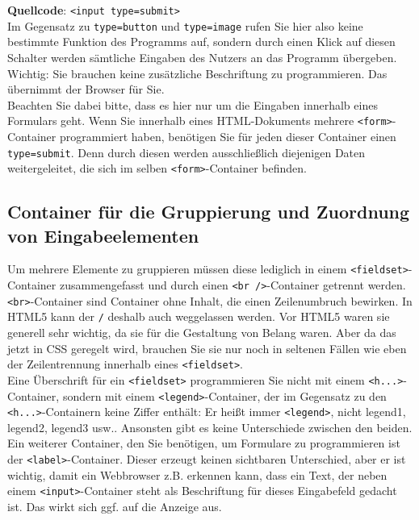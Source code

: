 \begin{itemize}
	\textbf{Quellcode}: \verb|<input type=submit>|\\
	
	Im Gegensatz zu \verb|type=button| und \verb|type=image| rufen Sie hier also keine bestimmte Funktion des Programms auf, sondern durch einen Klick auf diesen Schalter werden sämtliche Eingaben des Nutzers an das Programm übergeben.\\
	
	Wichtig: Sie brauchen keine zusätzliche Beschriftung zu programmieren. Das übernimmt der Browser für Sie.\\
	
	Beachten Sie dabei bitte, dass es hier nur um die Eingaben innerhalb eines Formulars geht. Wenn Sie innerhalb eines HTML-Dokuments mehrere \verb|<form>|-Container programmiert haben, benötigen Sie für jeden dieser Container einen \verb|type=submit|. Denn durch diesen werden ausschließlich diejenigen Daten weitergeleitet, die sich im selben \verb|<form>|-Container befinden.
\end{itemize}

\subsection{Container für die Gruppierung und Zuordnung von Eingabeelementen}

Um mehrere Elemente zu gruppieren müssen diese lediglich in einem \verb|<fieldset>|-Container zusammengefasst und durch einen \verb|<br />|-Container getrennt werden. \verb|<br>|-Container sind Container ohne Inhalt, die einen Zeilenumbruch bewirken. In HTML5 kann der \verb|/| deshalb auch weggelassen werden. Vor HTML5 waren sie generell sehr wichtig, da sie für die Gestaltung von Belang waren. Aber da das jetzt in CSS geregelt wird, brauchen Sie sie nur noch in seltenen Fällen wie eben der Zeilentrennung innerhalb eines \verb|<fieldset>|.\\

Eine Überschrift für ein \verb|<fieldset>| programmieren Sie nicht mit einem \verb|<h...>|-Container, sondern mit einem \verb|<legend>|-Container, der im Gegensatz zu den \verb|<h...>|-Containern keine Ziffer enthält: Er \glqq{}heißt\grqq{} immer \verb|<legend>|, nicht legend1, legend2, legend3 usw.. Ansonsten gibt es keine Unterschiede zwischen den beiden.\\

Ein weiterer Container, den Sie benötigen, um Formulare zu programmieren ist der \verb|<label>|-Container. Dieser erzeugt keinen sichtbaren Unterschied, aber er ist wichtig, damit ein Webbrowser z.B. erkennen kann, dass ein Text, der neben einem \verb|<input>|-Container steht als Beschriftung für dieses Eingabefeld gedacht ist. Das wirkt sich ggf. auf die Anzeige aus.\\

